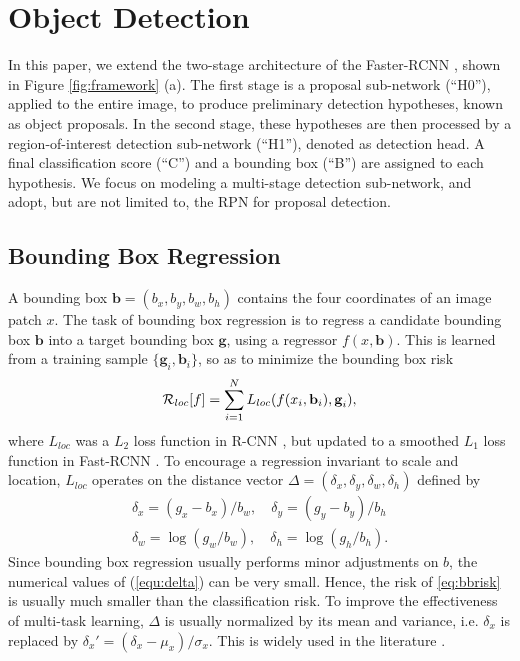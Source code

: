 \documentclass[10pt,twocolumn,letterpaper]{article}
\begin{document}
\section{Object Detection}

In this paper, we extend the two-stage architecture of the
Faster-RCNN \cite{DBLP:conf/nips/RenHGS15,lin2017feature}, shown in
Figure \ref{fig:framework} (a). The first stage is a proposal sub-network
(``H0''), applied to the entire image, to produce preliminary detection
hypotheses, known as object proposals. In the second stage, these
hypotheses are then processed by a region-of-interest detection
sub-network (``H1''), denoted as detection head. A final classification
score (``C'') and a bounding box (``B'') are assigned to each hypothesis.
We focus on modeling a multi-stage detection sub-network, and adopt, but
are not limited to, the RPN \cite{DBLP:conf/nips/RenHGS15} for proposal
detection.


\subsection{Bounding Box Regression}
\label{subsec:bbox}

A bounding box $\textbf{b}=(b_x,b_y,b_w,b_h)$ contains the four coordinates of
an image patch $x$. The task of bounding box
regression is to regress a candidate bounding box $\textbf{b}$ into a target
bounding box $\textbf{g}$, using a regressor $f(x,\textbf{b})$. This is
learned from a training sample
$\{\textbf{g}_i,\textbf{b}_i\}$, so as to minimize the bounding box risk
\begin{equation}
  {\cal R}_{loc}[f] = \sum_{i=1}^{N}L_{loc}(f(x_i,\textbf{b}_i),\textbf{g}_i),
  \label{eq:bbrisk}
\end{equation}
where $L_{loc}$ was a $L_2$ loss function in R-CNN \cite{DBLP:conf/cvpr/GirshickDDM14}, but updated to a smoothed $L_1$ loss function in Fast-RCNN \cite{DBLP:conf/iccv/Girshick15}. To encourage a regression invariant to scale and location, $L_{loc}$ operates on the distance vector $\Delta=(\delta_x,\delta_y,\delta_w,\delta_h)$ defined by
\begin{equation}
\label{equ:delta}
\begin{array}{cl}\delta_x=(g_x-b_x)/b_w,\quad\delta_y=(g_y-b_y)/b_h\\
\delta_w=\log(g_w/b_w),\quad\delta_h=\log(g_h/b_h).\end{array}
\end{equation}
Since bounding box regression usually performs minor adjustments on $b$, the numerical values of (\ref{equ:delta}) can be very
small. Hence, the risk of \eqref{eq:bbrisk} is usually much smaller
than the classification risk. To improve the effectiveness of multi-task
learning, $\Delta$ is usually normalized by its mean and variance, i.e.
$\delta_x$ is replaced by $\delta_x'=(\delta_x-\mu_x)/\sigma_x$. This is widely
used in the literature \cite{DBLP:conf/nips/RenHGS15,DBLP:conf/eccv/CaiFFV16,DBLP:conf/nips/DaiLHS16,lin2017feature,he2017mask}.
\end{document}
